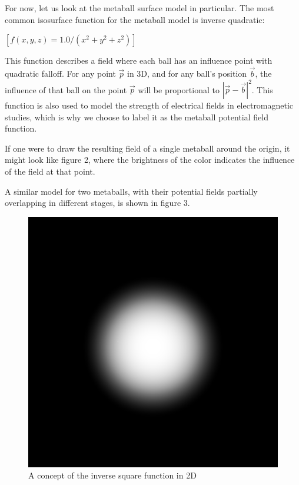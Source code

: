 \documentclass{article}
\begin{document}
\begin{multicols}{2}
            For now, let us look at the metaball surface model in particular. The most common isosurface function for the metaball model is inverse quadratic:

            $[f(x,y,z) = 1.0 / (x^2 + y^2 + z^2)]$

            This function describes a field where each ball has an influence point with quadratic falloff.
            For any point $\vec{p}$ in 3D, and for any ball's position $\vec{b}$, the influence of that ball on the point $\vec{p}$ will be proportional to $|\vec{p} - \vec{b}|^2$.
            This function is also used to model the strength of electrical fields in electromagnetic studies, which is why we choose to label it as the metaball potential field function.
            \cite{geiss00}

            If one were to draw the resulting field of a single metaball around the origin, it might look like figure 2, where the brightness of the color indicates the influence of the field at that point.
            
            A similar model for two metaballs, with their potential fields partially overlapping in different stages, is shown in figure 3.
            
            \begin{figure}[H]
            	\centering
            	\begin{minipage}[b]{0.2\textwidth}
            		\centering
            		\includegraphics[width=\textwidth]{img/2d-potential.png}
            		\caption{A concept of the inverse square function in 2D}
		            \label{fig:2d-potential}
            	\end{minipage}
            \end{figure}
        

\end{multicols}
\end{document}
